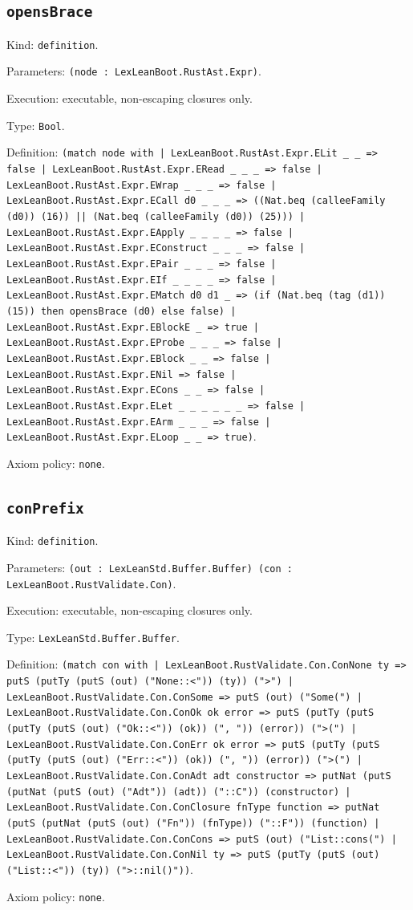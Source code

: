 \documentclass[11pt]{article}
\begin{document}
\subsection*{\texttt{opensBrace}}
\noindent Kind: \texttt{definition}.\par
\noindent Parameters: \texttt{(node : LexLeanBoot.RustAst.Expr)}.\par
\noindent Execution: executable, non-escaping closures only.\par
\noindent Type: \texttt{Bool}.\par
\noindent Definition: \texttt{(match node with | LexLeanBoot.RustAst.Expr.ELit \_ \_ => false | LexLeanBoot.RustAst.Expr.ERead \_ \_ \_ => false | LexLeanBoot.RustAst.Expr.EWrap \_ \_ \_ => false | LexLeanBoot.RustAst.Expr.ECall d0 \_ \_ \_ => ((Nat.beq (calleeFamily (d0)) (16)) || (Nat.beq (calleeFamily (d0)) (25))) | LexLeanBoot.RustAst.Expr.EApply \_ \_ \_ \_ => false | LexLeanBoot.RustAst.Expr.EConstruct \_ \_ \_ => false | LexLeanBoot.RustAst.Expr.EPair \_ \_ \_ => false | LexLeanBoot.RustAst.Expr.EIf \_ \_ \_ \_ => false | LexLeanBoot.RustAst.Expr.EMatch d0 d1 \_ => (if (Nat.beq (tag (d1)) (15)) then opensBrace (d0) else false) | LexLeanBoot.RustAst.Expr.EBlockE \_ => true | LexLeanBoot.RustAst.Expr.EProbe \_ \_ \_ => false | LexLeanBoot.RustAst.Expr.EBlock \_ \_ => false | LexLeanBoot.RustAst.Expr.ENil => false | LexLeanBoot.RustAst.Expr.ECons \_ \_ => false | LexLeanBoot.RustAst.Expr.ELet \_ \_ \_ \_ \_ \_ => false | LexLeanBoot.RustAst.Expr.EArm \_ \_ \_ => false | LexLeanBoot.RustAst.Expr.ELoop \_ \_ => true)}.\par
\noindent Axiom policy: \texttt{none}.\par
\subsection*{\texttt{conPrefix}}
\noindent Kind: \texttt{definition}.\par
\noindent Parameters: \texttt{(out : LexLeanStd.Buffer.Buffer) (con : LexLeanBoot.RustValidate.Con)}.\par
\noindent Execution: executable, non-escaping closures only.\par
\noindent Type: \texttt{LexLeanStd.Buffer.Buffer}.\par
\noindent Definition: \texttt{(match con with | LexLeanBoot.RustValidate.Con.ConNone ty => putS (putTy (putS (out) ("None::<")) (ty)) (">") | LexLeanBoot.RustValidate.Con.ConSome => putS (out) ("Some(") | LexLeanBoot.RustValidate.Con.ConOk ok error => putS (putTy (putS (putTy (putS (out) ("Ok::<")) (ok)) (", ")) (error)) (">(") | LexLeanBoot.RustValidate.Con.ConErr ok error => putS (putTy (putS (putTy (putS (out) ("Err::<")) (ok)) (", ")) (error)) (">(") | LexLeanBoot.RustValidate.Con.ConAdt adt constructor => putNat (putS (putNat (putS (out) ("Adt")) (adt)) ("::C")) (constructor) | LexLeanBoot.RustValidate.Con.ConClosure fnType function => putNat (putS (putNat (putS (out) ("Fn")) (fnType)) ("::F")) (function) | LexLeanBoot.RustValidate.Con.ConCons => putS (out) ("List::cons(") | LexLeanBoot.RustValidate.Con.ConNil ty => putS (putTy (putS (out) ("List::<")) (ty)) (">::nil()"))}.\par
\noindent Axiom policy: \texttt{none}.\par
\end{document}
